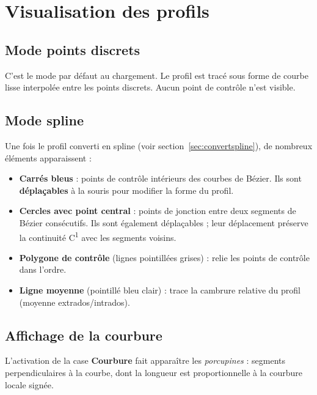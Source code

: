 \section{Visualisation des profils}

\subsection{Mode points discrets}

C'est le mode par défaut au chargement. Le profil est tracé sous
forme de courbe lisse interpolée entre les points discrets. Aucun
point de contrôle n'est visible.

\subsection{Mode spline}

Une fois le profil converti en spline (voir
section~\ref{sec:convertspline}), de nombreux éléments
apparaissent :


\begin{itemize}
    \item \textbf{Carrés bleus} : points de contrôle intérieurs
        des courbes de Bézier. Ils sont \textbf{déplaçables}
        à la souris pour modifier la forme du profil.
    \item \textbf{Cercles avec point central} : points de jonction
        entre deux segments de Bézier consécutifs. Ils sont
        également déplaçables ; leur déplacement préserve la
        continuité C\textsuperscript{1} avec les segments voisins.
    \item \textbf{Polygone de contrôle} (lignes pointillées
        grises) : relie les points de contrôle dans l'ordre.
    \item \textbf{Ligne moyenne} (pointillé bleu clair) :
        trace la cambrure relative du profil (moyenne
        extrados/intrados).
\end{itemize}

\subsection{Affichage de la courbure}

L'activation de la case \textbf{Courbure} fait apparaître les
\emph{porcupines} : segments perpendiculaires à la courbe, dont
la longueur est proportionnelle à la courbure locale signée.

